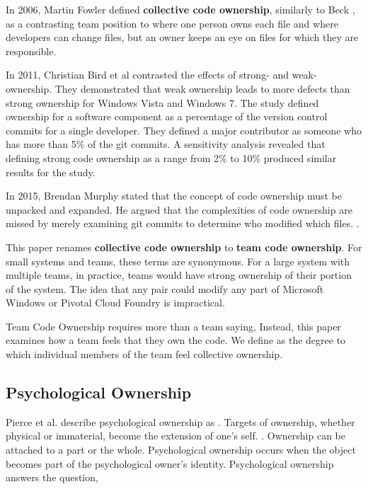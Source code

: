 In 2006, Martin Fowler defined \textbf{collective code ownership}, similarly to Beck \cite{FowlerCodeOwnership}, as a contrasting team position to  where one person owns each file and  where developers can change files, but an owner keeps an eye on files for which they are responsible. 

In 2011, Christian Bird et al \cite{BirdDontTouchMyCode} contrasted the effects of strong- and weak-ownership. They demonstrated that weak ownership leads to more defects than strong ownership for Windows Vista and Windows 7. The study defined ownership for a software component as a percentage of the version control commits for a single developer. They defined a major contributor as someone who has more than 5\% of the git commits. A sensitivity analysis revealed that defining strong code ownership as a range from 2\% to 10\% produced similar results for the study.

In 2015, Brendan Murphy stated that the concept of code ownership must be unpacked and expanded. He argued that the complexities of code ownership are missed by merely examining git commits to determine who modified which files. \cite{MurphyIEEESoftware}.

This paper renames \textbf{collective code ownership} to \textbf{team code ownership}. For small systems and teams, these terms are synonymous. For a large system with multiple teams, in practice, teams would have strong ownership of their portion of the system. The idea that any pair could modify any part of Microsoft Windows or Pivotal Cloud Foundry is impractical.

Team Code Ownership requires more than a team saying,  Instead, this paper examines how a team feels that they own the code. We define  as the degree to which individual members of the team feel collective ownership.  

\subsection{Psychological Ownership}
Pierce et al. describe psychological ownership as  \cite{Pierce2001}. Targets of ownership, whether physical or immaterial, become the extension of one’s self.  \cite{Isaacs1933}. Ownership can be attached to a part or the whole. Psychological ownership occurs when the object becomes part of the psychological owner’s identity. Psychological ownership answers the question, 

